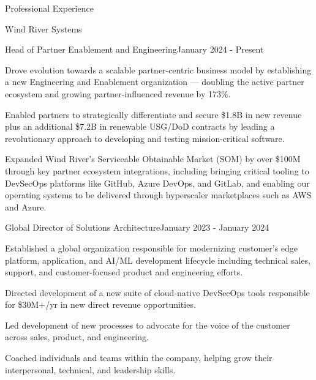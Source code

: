 \documentclass{resume} %
\begin{document}



\begin{rSection}{Professional Experience}
  
  \begin{rCompany}{Wind River Systems}{}{}

    \begin{rSubSubsection}{Head of Partner Enablement and Engineering}{}{January 2024 - Present}
      \item Drove evolution towards a scalable partner-centric business model by establishing a new Engineering and Enablement organization --- doubling the active partner ecosystem and growing partner-influenced revenue by 173\%.
      \item Enabled partners to strategically differentiate and secure \$1.8B in new revenue plus an additional \$7.2B in renewable USG/DoD contracts by leading a revolutionary approach to developing and testing mission-critical software.
      \item Expanded Wind River's Serviceable Obtainable Market (SOM) by over \$100M through key partner ecosystem integrations, including bringing critical tooling to DevSecOps platforms like GitHub, Azure DevOps, and GitLab, and enabling our operating systems to be delivered through hyperscaler marketplaces such as AWS and Azure.

    \end{rSubSubsection}
    
    \begin{rSubSubsection}{Global Director of Solutions Architecture}{}{January 2023 - January 2024}
      \item Established a global organization responsible for modernizing customer's edge platform, application, and AI/ML development lifecycle including technical sales, support, and customer-focused product and engineering efforts.
      \item Directed development of a new suite of cloud-native DevSecOps tools responsible for \$30M+/yr in new direct revenue opportunities.
      \item Led development of new processes to advocate for the voice of the customer across sales, product, and engineering.
      \item Coached individuals and teams within the company, helping grow their interpersonal, technical, and leadership skills.
    \end{rSubSubsection}
  \end{rCompany}


\end{rSection}
\end{document}
